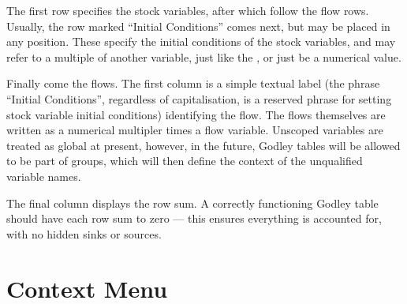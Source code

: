 The first row specifies the stock variables, after which follow the
flow rows. Usually, the row marked ``Initial Conditions'' comes next,
but may be placed in any position. These specify the initial
conditions of the stock variables, and may refer to a multiple of
another variable, just like the , or just be a numerical value.

Finally come the flows. The first column is a simple textual label
(the phrase ``Initial Conditions'', regardless of capitalisation, is a
reserved phrase for setting stock variable initial conditions)
identifying the flow. The flows themselves are written as a numerical
multipler times a flow variable. Unscoped variables are treated as
global at present, however, in the future, Godley tables will be
allowed to be part of groups, which will then define the context of
the unqualified variable names.

The final column displays the row sum. A correctly functioning Godley
table should have each row sum to zero --- this ensures everything is
accounted for, with no hidden sinks or sources.

\section{Context Menu}

